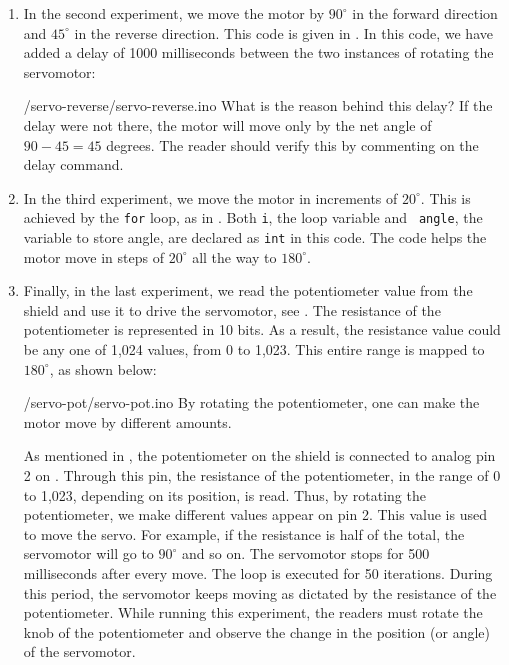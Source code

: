 \begin{enumerate}
  \item In the second experiment, we move the motor by $90^\circ$ in the
        forward direction and $45^\circ$ in the reverse direction.  This
        code is given in .  In this code, 
        we have added a delay of 1000 milliseconds between the two instances of 
        rotating the servomotor: 
        
        {\LocSERardcode/servo-reverse/servo-reverse.ino}
        What is the reason behind this delay?  If the delay were not
        there, the motor will move only by the net angle of $90-45 = 45$
        degrees.  The reader should verify this by commenting on the delay
        command.
        
  \item In the third experiment, we move the motor in increments of
        $20^\circ$.  This is achieved by the {\tt for} loop, as in
        .  Both {\tt i}, the loop variable and {\tt
            angle}, the variable to store angle, are declared as {\tt int} in
        this code.  The code helps the motor move in steps of $20^\circ$ all
        the way to $180^\circ$.  
        
  \item Finally, in the last experiment, we read the potentiometer value
        from the shield and use it to drive the servomotor, see
        .  The resistance of the potentiometer is
        represented in 10 bits.  As a result, the resistance value could be
        any one of 1,024 values, from 0 to 1,023.  This entire range is
        mapped to $180^\circ$, as shown below:
        
        {\LocSERardcode/servo-pot/servo-pot.ino}
        By rotating the potentiometer, one can make
        the motor move by different amounts.
        
        As mentioned in , the potentiometer on the shield is connected 
        to analog pin 2 on \arduino. Through this pin, the resistance of the potentiometer, in the range of 0 to 1,023,
        depending on its position, is read.  Thus, by rotating the
        potentiometer, we make different values appear on pin 2.  This value
        is used to move the servo.  For example, if the resistance is half
        of the total, the servomotor will go to $90^\circ$ and so on.  The
        servomotor stops for 500 milliseconds after every move.  The loop is
        executed for 50 iterations. During this period, the servomotor keeps moving as dictated by the
        resistance of the potentiometer. While running this experiment, the readers 
        must rotate the knob of the potentiometer and observe 
        the change in the position (or angle) of the servomotor.   
        
\end{enumerate}


